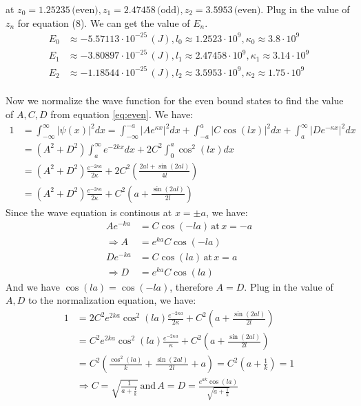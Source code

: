\documentclass{article}
\begin{document}
at \(z_0 = 1.25235 \, \text{(even)}, z_1 = 2.47458 \, \text{(odd)}, z_2 = 3.5953 \, \text{(even)} \). Plug in the value of \(z_n\) for equation (8). We can get the value of \(E_n\). 
\begin{align*}
    E_0 & \approx -5.57113 \cdot 10^{-25} \, (J), l_0 \approx 1.2523 \cdot 10^9 , \kappa_0 \approx 3.8 \cdot 10^9 \\
    E_1 & \approx  -3.80897 \cdot 10^{-25} \, (J), l_1 \approx 2.47458 \cdot 10^9, \kappa_1 \approx 3.14 \cdot 10^9\\
    E_2 & \approx -1.18544 \cdot 10^{-25} \, (J), l_2 \approx 3.5953 \cdot 10^9, \kappa_2 \approx 1.75 \cdot 10^9
\end{align*}
\\
Now we normalize the wave function for the even bound states to find the value of \(A, C, D\) from equation \eqref{eq:even}. We have:
\begin{align*}
    1 & = \int_{-\infty}^{\infty} |\psi(x)|^2 dx = \int_{-\infty}^{-a} |Ae^{\kappa x}|^2 dx + \int_{-a}^{a} |C \cos(l x)|^2 dx + \int_{a}^{\infty} |De^{-\kappa x}|^2 dx \\
    &= (A^2 + D^2)\int_{a}^{\infty} e^{-2kx} dx  + 2 C^2 \int_{0}^{a} \cos^2(lx) dx \\
    &= (A^2 + D^2)\frac{e^{-2\kappa a}}{2\kappa} +2 C^2 \left(\frac{2al + \sin(2al)}{4l}\right) \\
    &= (A^2 + D^2)\frac{e^{-2\kappa a}}{2\kappa} + C^2 \left(a + \frac{\sin(2al)}{2l}\right)
\end{align*}
Since the wave equation is continous at \(x = \pm a\), we have:
\begin{align*}
    Ae^{-ka} &= C \cos(-la) \, \text{at} \, x = -a \\
    \Rightarrow A &= e^{ka} C \cos(-la) \\
    De^{-ka} &= C \cos(la) \, \text{at} \, x = a \\
    \Rightarrow D &= e^{ka} C \cos(la)
\end{align*}
And we have \(\cos(la) = \cos(-la)\), therefore \(A = D\). Plug in the value of \(A, D\) to the normalization equation, we have:
\begin{align*}
    1 &= 2 C^2 e^{2ka} \cos^2(la) \frac{e^{-2\kappa a}}{2\kappa} + C^2 \left(a + \frac{\sin(2al)}{2l}\right) \\
    &= C^2 e^{2ka} \cos^2(la) \frac{e^{-2\kappa a}}{\kappa} + C^2 \left(a + \frac{\sin(2al)}{2l}\right) \\
    &= C^2 \left(\frac{\cos^2(la)}{k} + \frac{\sin(2al)}{2l}+a\right) = C^2 \left(a+\frac{1}{k}\right) = 1 \\
    & \Rightarrow C = \sqrt{\frac{1}{a+\frac{1}{k}}} \, \text{and} \, A = D = \frac{e^{ak} \cos(la)}{\sqrt{a + \frac{1}{k}}}
\end{align*}
\end{document}
